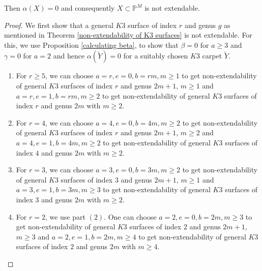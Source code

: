 \documentclass[11pt,twoside]{amsart}
\theoremstyle{plain}
\numberwithin{equation}{section}
\theoremstyle{definition}
\begin{document}
Then $\alpha(X) = 0$ and consequently $X \subset \mathbb{P}^M$ is not extendable.

\begin{proof}
    We first show that a general $K3$ surface of index $r$ and genus $g$ as mentioned in Theorem \ref{non-extendability of K3 surfaces} is not extendable. For this, we use Proposition \ref{calculating beta}, to show that $\beta = 0$ for $a \geq 3$ and $\gamma = 0$ for $a = 2$ and hence $\alpha(\widetilde{Y}) = 0$ for a suitably chosen $K3$ carpet $\widetilde{Y}$. 
    \begin{enumerate}
        \item[(1)] For $r \geq 5$, we can choose $a = r, e = 0, b = rm, m \geq 1$ to get non-extendability of general $K3$ surfaces of index $r$ and genus $2m+1$, $m \geq 1$ and $a = r, e = 1, b = rm, m \geq 2$ to get non-extendability of general $K3$ surfaces of index $r$ and genus $2m$ with $m \geq 2$. 

        \smallskip
        
        \item[(2)] For $r = 4$, we can choose $a = 4, e = 0, b = 4m, m \geq 2$ to get non-extendability of general $K3$ surfaces of index $r$ and genus $2m+1$, $m \geq 2$ and $a = 4, e = 1, b = 4m, m \geq 2$ to get non-extendability of general $K3$ surfaces of index $4$ and genus $2m$ with $m \geq 2$. 

       \smallskip
        
        \item[(3)] For $r = 3$, we can choose $a = 3, e = 0, b = 3m, m \geq 2$ to get non-extendability of general $K3$ surfaces of index $3$ and genus $2m+1$, $m \geq 1$ and $a = 3, e = 1, b = 3m, m \geq 3$ to get non-extendability of general $K3$ surfaces of index $3$ and genus $2m$ with $m \geq 2$. 
        
        \smallskip

        \item[(4)] For $r = 2$, we use part $(2)$. One can choose $a = 2, e = 0, b = 2m, m \geq 3$ to get non-extendability of general $K3$ surfaces of index $2$ and genus $2m+1$, $m \geq 3$ and $a = 2, e = 1, b = 2m, m \geq 4$ to get non-extendability of general $K3$ surfaces of index $2$ and genus $2m$ with $m \geq 4$.
        

\end{enumerate}
\end{proof}
\end{document}
